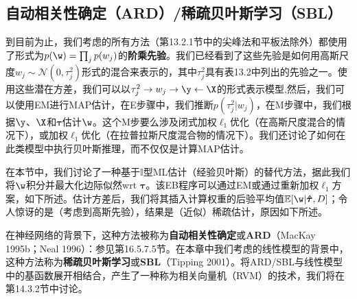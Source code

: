 \documentclass[a4paper]{article}
\begin{document}
\subsection{自动相关性确定（ARD）/稀疏贝叶斯学习（SBL）}
到目前为止，我们考虑的所有方法（第13.2.1节中的尖峰法和平板法除外）都使用了形式为$p(\w)=\prod_{j}p(w_j)$的\textbf{阶乘先验}。我们已经看到了这些先验是如何用高斯尺度$w_j\sim \mathcal{N}(0,\tau_j^2)$形式的混合来表示的，其中$\tau_j^2$具有表13.2中列出的先验之一。使用这些潜在方差，我们可以以$\tau_j^2\to w_j\to \y \gets \X$的形式表示模型,然后，我们可以使用EM进行MAP估计，在E步骤中，我们推断$p(\tau_j^2|w_j)$，在M步骤中，我们根据$\y$、$\X$和$\boldsymbol{\tau}$估计$\w$。这个M步要么涉及闭式加权$\ell_1$优化（在高斯尺度混合的情况下），或加权$\ell_1$优化（在拉普拉斯尺度混合物的情况下）。我们还讨论了如何在此类模型中执行贝叶斯推理，而不仅仅是计算MAP估计。

在本节中，我们讨论了一种基于$\mathbb{I}$型ML估计（经验贝叶斯）的替代方法，据此我们将$\w$积分并最大化边际似然wrt $\boldsymbol{\tau}$。该EB程序可以通过EM或通过重新加权$\ell_1$方案，如下所述。估计方差后，我们将其插入计算权重的后验平均值$\mathbb{E}[\w|\boldsymbol{\hat{\tau}},D]$；令人惊讶的是（考虑到高斯先验），结果是（近似）稀疏估计，原因如下所述。

在神经网络的背景下，这种方法被称为\textbf{自动相关性确定}或\textbf{ARD}（MacKay 1995b；Neal 1996）：参见第16.5.7.5节。在本章中我们考虑的线性模型的背景中，这种方法称为\textbf{稀疏贝叶斯学习}或\textbf{SBL}（Tipping 2001）。将ARD/SBL与线性模型中的基函数展开相结合，产生了一种称为相关向量机（RVM）的技术，我们将在第14.3.2节中讨论。
\end{document}
